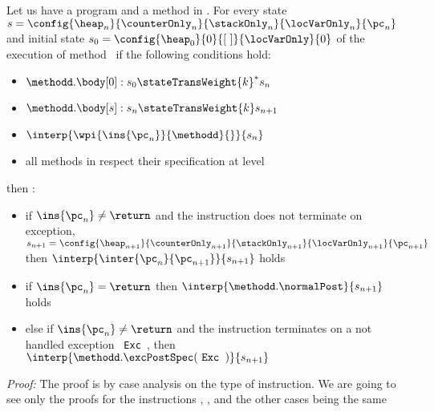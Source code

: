 \begin{lemma} \label{lemma0}
Let us have a program \Program{} and a method \methodd{} in \Program.
For every state $s =\config{\heap_n }{\counterOnly_n }{\stackOnly_n }{\locVarOnly_n }{\pc_n } $ and
initial state $s_{0} =\config{\heap_{0}  }{ 0 }{\lbrack \ \rbrack }{\locVarOnly }{ 0 } $ 
   of the execution of method \methodd \  if the following conditions hold: 
 \begin{itemize}
         \item $ \methodd.\body[0] : s_{0} \stateTransWeight{k}^{*} s_n$
         \item $ \methodd.\body[s] : s_n \stateTransWeight{k} s_{n+1}$
         \item $ \interp{\wpi{\ins{\pc_n}}{\methodd}{}}{s_n} $
	 \item all methods in \Program{} respect their specification at level   
 \end{itemize}
  
  then : 
 \begin{itemize}
         \item if  $ \ins{\pc_n} \neq \return $ and the instruction does not terminate on exception,\\
	      $ s_{n+1} = \config{\heap_{n+1} }{\counterOnly_{n+1} }{ \stackOnly_{n+1}}{\locVarOnly_{n+1} }{ \pc_{n+1} }  $
	       then  $ \interp{\inter{\pc_n}{\pc_{n+1}}}{s_{n+1}}  $   holds 
        \item if  $ \ins{\pc_n} = \return $ then  $ \interp{\methodd.\normalPost}{s_{n+1}}  $   holds
	\item else if $ \ins{\pc_n } \neq \return $ and the instruction terminates on a not handled exception \mbox{ \rm\texttt{Exc }}, then
	      $ \interp{\methodd.\excPostSpec( \mbox{ \rm\texttt{Exc }} )}{ s_{n+1} }  $ 
	
  \end{itemize} 
\end{lemma}
\textit{Proof:}
The proof is by case analysis on the type of instruction. %
We are going to see only the proofs for the instructions \return , \load, \new{} and \putfield{} the other cases being the same
